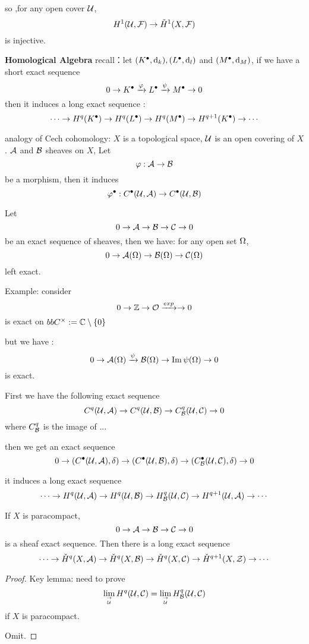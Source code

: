 so ,for any open cover $\mathcal{U}$,
$$H^1(\mathcal{U},\mathcal{F})\to \check{H}^1(X,\mathcal{F})$$
is injective.

\textbf{Homological Algebra}
recall：let $(K^{\bullet},\mathrm{d}_k),(L^{\bullet},\mathrm{d}_l)$ and $(M^{\bullet},\mathrm{d}_M)$,
if we have a short exact sequence
$$0\to K^{\bullet}\xrightarrow{\varphi} L^{\bullet}\xrightarrow{\psi}M^{\bullet}\to 0$$
then it induces a long exact sequence :
$$
  \cdots\to H^q(K^{\bullet})\to
  H^q(L^{\bullet})\to
  H^q(M^{\bullet})\to
  H^{q+1}(K^{\bullet})\to\cdots
$$

analogy of Cech cohomology: $X$ is a topological space,
$\mathcal{U}$ is an open covering of $X$.
$\mathcal{A}$ and $\mathcal{B}$ sheaves on $X$, Let
$$\varphi:\mathcal{A}\to\mathcal{B}$$
be a morphism, then it induces
$$\varphi^{\bullet}:C^{\bullet}(\mathcal{U},\mathcal{A})\to C^{\bullet}(\mathcal{U},\mathcal{B})$$

Let
$$0\to \mathcal{A}\to\mathcal{B}\to\mathcal{C}\to 0$$
be an exact sequence of sheaves, then we have:
for any open set $\Omega$,
$$0\to \mathcal{A}(\Omega)\to \mathcal{B}(\Omega)\to\mathcal{C}(\Omega)$$
left exact.

Example: consider
$$0\to\mathbb{Z}\to\mathcal{O}\xrightarrow{exp}\to0$$
is exact on $bbC^{\times}:=\mathbb{C}\setminus\{0\}$

but we have :
$$0\to\mathcal{A}(\Omega)\xrightarrow{\psi}\mathcal{B}(\Omega)\to\operatorname{Im}\psi(\Omega)\to 0$$
is exact.

First we have the following exact sequence
$$C^q(\mathcal{U},\mathcal{A})\to C^q(\mathcal{U},\mathcal{B})\to C^q_{\mathcal{B}}(\mathcal{U},\mathcal{C})\to 0$$
where $C_{\mathcal{B}}^q$ is the image of ...

then we get an exact sequence
$$0\to (C^{\bullet}(\mathcal{U},\mathcal{A}),\delta)\to
(C^{\bullet}(\mathcal{U},\mathcal{B}),\delta)\to
(C^{\bullet}_{\mathcal{B}}(\mathcal{U},\mathcal{C}),\delta)\to 0$$

it induces a long exact sequence
$$\cdots\to
H^q(\mathcal{U},\mathcal{A})\to
H^q(\mathcal{U},\mathcal{B})\to
H^q_{\mathcal{B}}(\mathcal{U},\mathcal{C})\to
H^{q+1}(\mathcal{U},\mathcal{A})\to\cdots
$$

\begin{thm}
If $X$ is paracompact,
$$0\to\mathcal{A}\to\mathcal{B}\to\mathcal{C}\to 0$$
is a sheaf exact sequence.
Then there is a long exact sequence
$$
\cdots\to
\check{H}^q(X,\mathcal{A})\to
\check{H}^q(X,\mathcal{B})\to
\check{H}^q(X,\mathcal{C})\to
\check{H}^{q+1}(X,\mathcal{Z})\to \cdots
$$
\end{thm}
\begin{proof}

Key lemma: need to prove
$$\lim_{\to\atop\mathcal{U}}H^q(\mathcal{U},\mathcal{C})=
\lim_{\to\atop\mathcal{U}}H^q_{\mathcal{B}}(\mathcal{U},\mathcal{C})
$$
if $X$ is paracompact.

Omit.
\end{proof}


